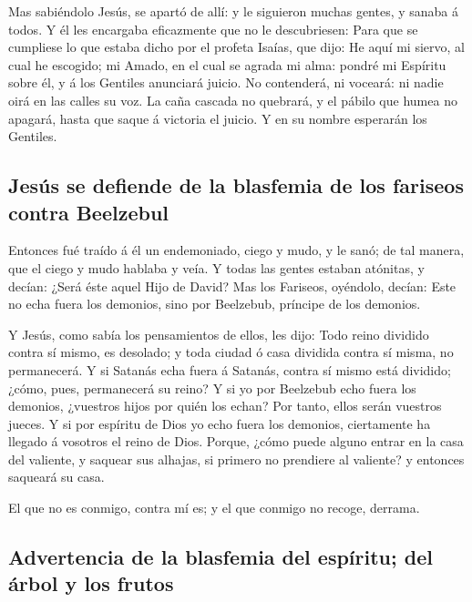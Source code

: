  Mas sabiéndolo Jesús, se apartó de allí: y le siguieron
muchas gentes, y sanaba á todos.  Y él les encargaba
eficazmente que no le descubriesen:  Para que se
cumpliese lo que estaba dicho por el profeta Isaías, que dijo:
 He aquí mi siervo, al cual he escogido; mi Amado, en el
cual se agrada mi alma: pondré mi Espíritu sobre él, y á los Gentiles
anunciará juicio.  No contenderá, ni voceará: ni nadie
oirá en las calles su voz.  La caña cascada no quebrará,
y el pábilo que humea no apagará, hasta que saque á victoria el juicio.
 Y en su nombre esperarán los Gentiles.

\hypertarget{jesuxfas-se-defiende-de-la-blasfemia-de-los-fariseos-contra-beelzebul}{%
\subsection{Jesús se defiende de la blasfemia de los fariseos contra
Beelzebul}\label{jesuxfas-se-defiende-de-la-blasfemia-de-los-fariseos-contra-beelzebul}}

 Entonces fué traído á él un endemoniado, ciego y mudo, y
le sanó; de tal manera, que el ciego y mudo hablaba y veía.
 Y todas las gentes estaban atónitas, y decían: ¿Será
éste aquel Hijo de David?  Mas los Fariseos, oyéndolo,
decían: Este no echa fuera los demonios, sino por Beelzebub, príncipe de
los demonios.

 Y Jesús, como sabía los pensamientos de ellos, les dijo:
Todo reino dividido contra sí mismo, es desolado; y toda ciudad ó casa
dividida contra sí misma, no permanecerá.  Y si Satanás
echa fuera á Satanás, contra sí mismo está dividido; ¿cómo, pues,
permanecerá su reino?  Y si yo por Beelzebub echo fuera
los demonios, ¿vuestros hijos por quién los echan? Por tanto, ellos
serán vuestros jueces.  Y si por espíritu de Dios yo echo
fuera los demonios, ciertamente ha llegado á vosotros el reino de Dios.
 Porque, ¿cómo puede alguno entrar en la casa del
valiente, y saquear sus alhajas, si primero no prendiere al valiente? y
entonces saqueará su casa.

 El que no es conmigo, contra mí es; y el que conmigo no
recoge, derrama.

\hypertarget{advertencia-de-la-blasfemia-del-espuxedritu-del-uxe1rbol-y-los-frutos}{%
\subsection{Advertencia de la blasfemia del espíritu; del árbol y los
frutos}\label{advertencia-de-la-blasfemia-del-espuxedritu-del-uxe1rbol-y-los-frutos}}

